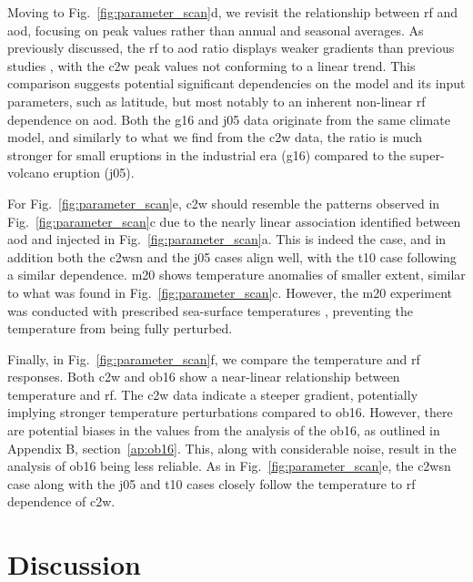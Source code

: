 \documentclass{ametsocV6.1}
\newcommand{\iso}[1][i]{{#1}njected \ce{SO2}}
\begin{document}
Moving to Fig.~\ref{fig:parameter_scan}d, we revisit the relationship between \gls{rf}
and \gls{aod}, focusing on peak values rather than annual and seasonal averages. As
previously discussed, the \gls{rf} to \gls{aod} ratio displays weaker gradients than
previous studies \citep{jones2005, marshall2020, timmreck2010}, with the \gls{c2w} peak
values not conforming to a linear trend. This comparison suggests potential significant
dependencies on the model and its input parameters, such as latitude, but most notably
to an inherent non-linear \gls{rf} dependence on \gls{aod}. Both the \gls{g16} and
\gls{j05} data originate from the same climate model, and similarly to what we find from
the \gls{c2w} data, the ratio is much stronger for small eruptions in the industrial era
(\gls{g16}) compared to the super-volcano eruption (\gls{j05}).

For Fig.~\ref{fig:parameter_scan}e, \gls{c2w} should resemble the patterns observed in
Fig.~\ref{fig:parameter_scan}c due to the nearly linear association identified between
\gls{aod} and \iso{} in Fig.~\ref{fig:parameter_scan}a. This is indeed the case, and in
addition both the \gls{c2wsn} and the \gls{j05} cases align well, with the \gls{t10}
case following a similar dependence. \gls{m20} shows temperature anomalies of smaller
extent, similar to what was found in Fig.~\ref{fig:parameter_scan}c. However, the
\gls{m20} experiment was conducted with prescribed sea-surface temperatures
\citep{marshall2020}, preventing the temperature from being fully perturbed.

Finally, in Fig.~\ref{fig:parameter_scan}f, we compare the temperature and \gls{rf}
responses. Both \gls{c2w} and \gls{ob16} show a near-linear relationship between
temperature and \gls{rf}. The \gls{c2w} data indicate a steeper gradient, potentially
implying stronger temperature perturbations compared to \gls{ob16}. However, there are
potential biases in the values from the analysis of the \gls{ob16}, as outlined in
Appendix B, section~\ref{ap:ob16}. This, along with considerable noise, result in the
analysis of \gls{ob16} being less reliable. As in Fig.~\ref{fig:parameter_scan}e, the
\gls{c2wsn} case along with the \gls{j05} and \gls{t10} cases closely follow the
temperature to \gls{rf} dependence of \gls{c2w}.

\section{Discussion}\label{sec:discussion}
\end{document}
